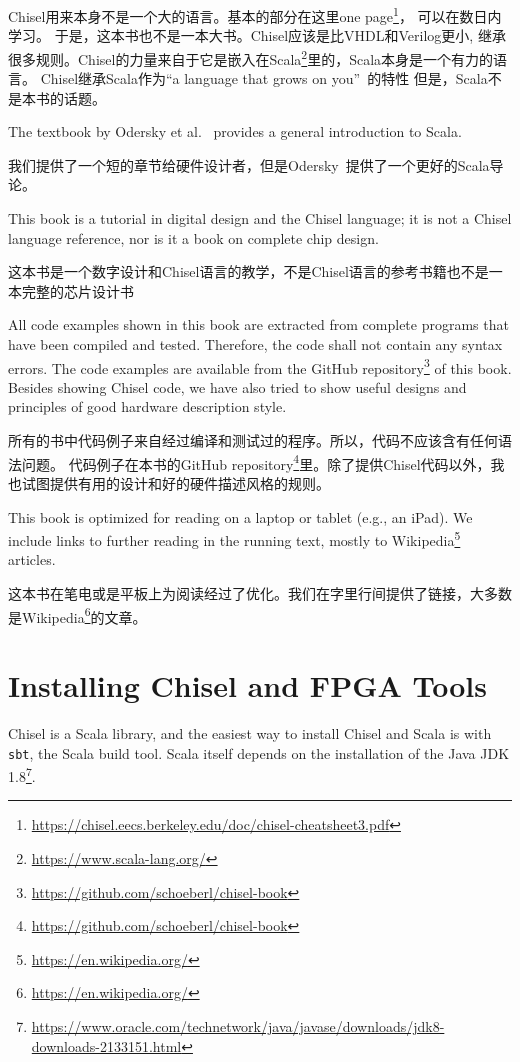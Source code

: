 \documentclass[%
    10pt,
    headinclude, footexclude,
    openright, %
    notitlepage,
    cleardoubleempty,
    headsepline,
    pointlessnumbers,
    bibtotoc, idxtotoc,
    ]{scrbook}
\newcommand{\code}[1]{{\small{\texttt{#1}}}}
\newcommand{\myref}[2]{\href{#1}{#2}}
\renewcommand{\myref}[2]{{#2}{\footnote{\url{#1}}}}
\begin{document}
Chisel用来本身不是一个大的语言。基本的部分在这里\myref{https://chisel.eecs.berkeley.edu/doc/chisel-cheatsheet3.pdf}{one page}， 可以在数日内学习。
于是，这本书也不是一本大书。Chisel应该是比VHDL和Verilog更小, 
继承很多规则。Chisel的力量来自于它是嵌入在\myref{https://www.scala-lang.org/}{Scala}里的，Scala本身是一个有力的语言。
Chisel继承Scala作为``a language that grows on you''~\cite{Scala}的特性
但是，Scala不是本书的话题。

The textbook by Odersky et al.~\cite{Scala} provides a general introduction
to Scala.

我们提供了一个短的章节给硬件设计者，但是Odersky~\cite{Scala}提供了一个更好的Scala导论。

This book is a tutorial in digital design and the Chisel language; it is not
a Chisel language reference, nor is it a book on complete chip design.

这本书是一个数字设计和Chisel语言的教学，不是Chisel语言的参考书籍也不是一本完整的芯片设计书

All code examples shown in this book are extracted from complete programs
that have been compiled and tested. Therefore, the code shall not contain
any syntax errors. The code examples are available from the
\myref{https://github.com/schoeberl/chisel-book}{GitHub repository}
of this book.
Besides showing Chisel code, we have also tried to show useful designs and
principles of good hardware description style.

所有的书中代码例子来自经过编译和测试过的程序。所以，代码不应该含有任何语法问题。
代码例子在本书的\myref{https://github.com/schoeberl/chisel-book}{GitHub repository}里。除了提供Chisel代码以外，我也试图提供有用的设计和好的硬件描述风格的规则。


This book is optimized for reading on a laptop or tablet (e.g., an iPad).
We include links to further reading in the running text, mostly to
\myref{https://en.wikipedia.org/}{Wikipedia} articles.

这本书在笔电或是平板上为阅读经过了优化。我们在字里行间提供了链接，大多数是\myref{https://en.wikipedia.org/}{Wikipedia}的文章。

\section{Installing Chisel and FPGA Tools}

Chisel is a Scala library, and the easiest way to install Chisel and Scala is
with \code{sbt}, the Scala build tool. Scala itself depends on the installation
of the \myref{https://www.oracle.com/technetwork/java/javase/downloads/jdk8-downloads-2133151.html}{Java JDK 1.8}.
\end{document}
